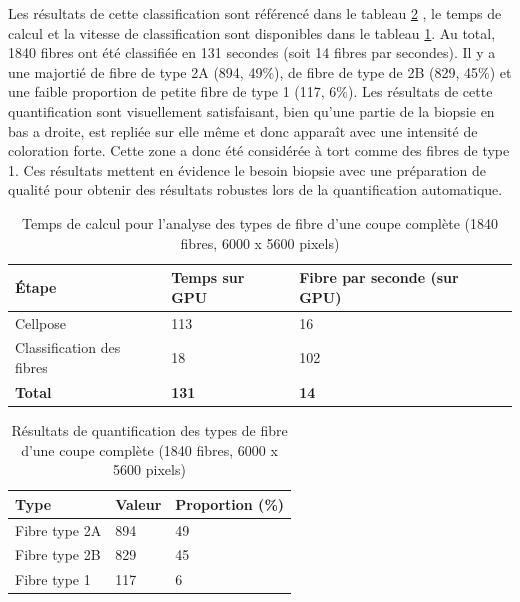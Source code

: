 Les résultats de cette classification sont référencé dans le tableau \ref{tab:atp_wsi_resultstable} , le temps de calcul et la vitesse de classification sont disponibles dans le tableau \ref{tab:atp_wsi_timetable}. Au total, 1840 fibres ont été classifiée en 131 secondes (soit 14 fibres par secondes). Il y a une majortié de fibre de type 2A (894, 49\%), de fibre de type de 2B (829, 45\%) et une faible proportion de petite fibre de type 1 (117, 6\%). Les résultats de cette quantification sont visuellement satisfaisant, bien qu'une partie de la biopsie en bas a droite, est repliée sur elle même et donc apparaît avec une intensité de coloration forte. Cette zone a donc été considérée à tort comme des fibres de type 1. Ces résultats mettent en évidence le besoin biopsie avec une préparation de qualité pour obtenir des résultats robustes lors de la quantification automatique.

\begin{table}[ht]
\centering
\caption{Temps de calcul pour l'analyse des types de fibre d'une coupe complète (1840 fibres, 6000 x 5600 pixels)}
\label{tab:atp_wsi_timetable}
\begin{tabularx}{\textwidth}{|X|X|X|}
\hline
\textbf{Étape} & \textbf{Temps sur GPU} & \textbf{Fibre par seconde (sur GPU)} \\
\toprule
Cellpose & 113 & 16 \\
\hline
Classification des fibres & 18 & 102 \\
\hline
\textbf{Total} & \textbf{131} & \textbf{14} \\
\hline
\end{tabularx}
\end{table}
\begin{table}[ht]
\centering
\caption{Résultats de quantification des types de fibre d'une coupe complète (1840 fibres, 6000 x 5600 pixels)}
\label{tab:atp_wsi_resultstable}
\begin{tabularx}{\textwidth}{|X|X|X|}
\hline
\textbf{Type} & \textbf{Valeur} & \textbf{Proportion (\%)} \\
\toprule
Fibre type 2A & 894 & 49 \\
\hline
Fibre type 2B & 829 & 45 \\
\hline
Fibre type 1 & 117 & 6 \\
\hline
\end{tabularx}
\end{table}


